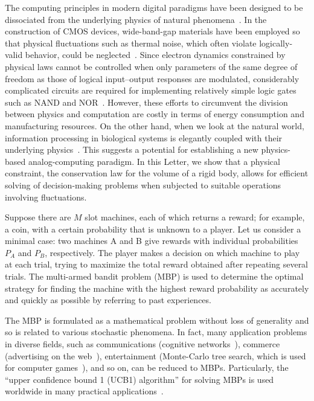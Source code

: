 \documentclass[twocolumn,showpacs,preprintnumbers,amsmath,amssymb]{revtex4}
\begin{document}
The computing principles in modern digital paradigms have been designed to be dissociated from the underlying physics of natural phenomena~\cite{beyondturing}.
In the construction of CMOS devices, wide-band-gap materials have been employed so that physical fluctuations such as thermal noise, which often violate logically-valid behavior, could be neglected~\cite{cmos}.
Since electron dynamics constrained by physical laws cannot be controlled when only parameters of the same degree of freedom as those of logical input--output responses are modulated, considerably complicated circuits are required for implementing relatively simple logic gates such as NAND and NOR~\cite{cmos2}.
However, these efforts to circumvent the division between physics and computation are costly in terms of energy consumption and manufacturing resources.
On the other hand, when we look at the natural world, information processing in biological systems is elegantly coupled with their underlying physics~\cite{natcom,natcom2}.
This suggests a potential for establishing a new physics-based analog-computing paradigm.
In this Letter, we show that a physical constraint, the conservation law for the volume of a rigid body, allows for efficient solving of decision-making problems when subjected to suitable operations involving fluctuations.

Suppose there are $M$ slot machines, each of which returns a reward; for example, a coin, with a certain probability that is unknown to a player.
Let us consider a minimal case: two machines A and B give rewards with individual probabilities $P_A$ and $P_B$, respectively.
The player makes a decision on which machine to play at each trial, trying to maximize the total reward obtained after repeating several trials.
The multi-armed bandit problem (MBP) is used to determine the optimal strategy for finding the machine with the highest reward probability as accurately and quickly as possible by referring to past experiences.

The MBP is formulated as a mathematical problem without loss of generality and so is related to various stochastic phenomena.
In fact, many application problems in diverse fields, such as communications (cognitive networks~\cite{cog,cog2}), commerce (advertising on the web~\cite{web}), entertainment (Monte-Carlo tree search, which is used for computer games~\cite{uct,mogo}), and so on, can be reduced to MBPs.
Particularly, the ``upper confidence bound 1 (UCB1) algorithm'' for solving MBPs is used worldwide in many practical applications~\cite{auer}.
\end{document}
